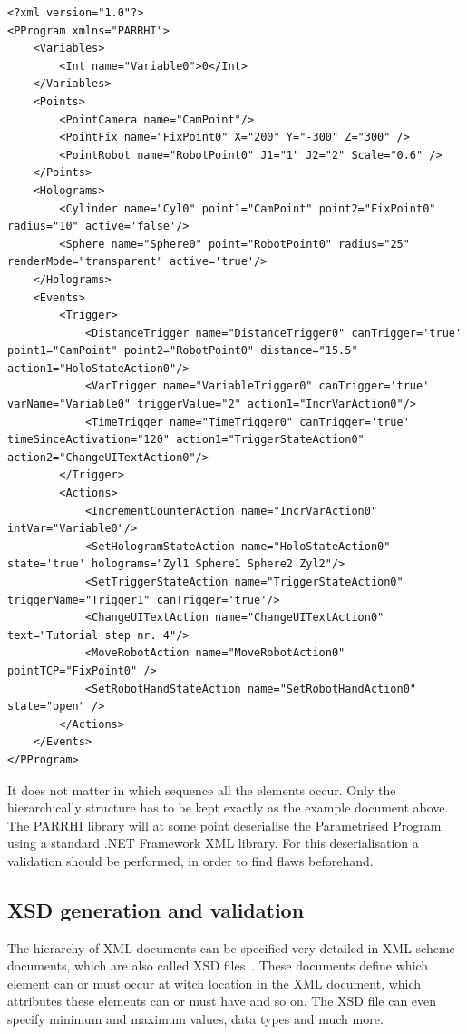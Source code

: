 \begin{lstlisting}
<?xml version="1.0"?>
<PProgram xmlns="PARRHI">
	<Variables>
		<Int name="Variable0">0</Int>
	</Variables>
	<Points>
		<PointCamera name="CamPoint"/>
		<PointFix name="FixPoint0" X="200" Y="-300" Z="300" />
		<PointRobot name="RobotPoint0" J1="1" J2="2" Scale="0.6" />
	</Points>
	<Holograms>
		<Cylinder name="Cyl0" point1="CamPoint" point2="FixPoint0" radius="10" active='false'/>
		<Sphere name="Sphere0" point="RobotPoint0" radius="25" renderMode="transparent" active='true'/>
	</Holograms>
	<Events>
		<Trigger>
			<DistanceTrigger name="DistanceTrigger0" canTrigger='true' point1="CamPoint" point2="RobotPoint0" distance="15.5" action1="HoloStateAction0"/>
			<VarTrigger name="VariableTrigger0" canTrigger='true' varName="Variable0" triggerValue="2" action1="IncrVarAction0"/>
			<TimeTrigger name="TimeTrigger0" canTrigger='true' timeSinceActivation="120" action1="TriggerStateAction0" action2="ChangeUITextAction0"/>
		</Trigger>
		<Actions>
			<IncrementCounterAction name="IncrVarAction0" intVar="Variable0"/>
			<SetHologramStateAction name="HoloStateAction0" state='true' holograms="Zyl1 Sphere1 Sphere2 Zyl2"/>
			<SetTriggerStateAction name="TriggerStateAction0" triggerName="Trigger1" canTrigger='true'/>
			<ChangeUITextAction name="ChangeUITextAction0" text="Tutorial step nr. 4"/>
			<MoveRobotAction name="MoveRobotAction0" pointTCP="FixPoint0" />
			<SetRobotHandStateAction name="SetRobotHandAction0" state="open" />
		</Actions>
	</Events>
</PProgram>
\end{lstlisting}

It does not matter in which sequence all the elements occur. Only the hierarchically structure has to be kept exactly as the example document above. The PARRHI library will at some point deserialise the Parametrised Program using a standard .NET Framework XML library. For this deserialisation a validation should be performed, in order to find flaws beforehand.

\subsection{XSD generation and validation}
The hierarchy of XML documents can be specified very detailed in XML-scheme documents, which are also called XSD files~\cite{xsdW3C}. These documents define which element can or must occur at witch location in the XML document, which attributes these elements can or must have and so on. The XSD file can even specify minimum and maximum values, data types and much more.

